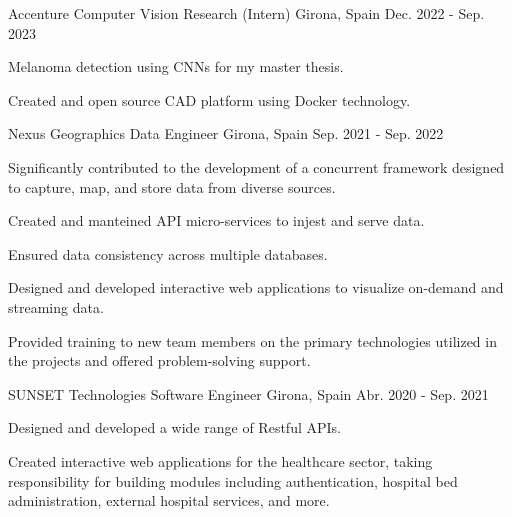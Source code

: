 \begin{cventries}
    \cventry
    {Accenture} %
    {Computer Vision Research (Intern)} %
    {Girona, Spain} %
    {Dec. 2022 - Sep. 2023} %
    {
    \begin{cvitems}
    \item{Melanoma detection using CNNs for my master thesis.}
    \item{Created and open source CAD platform using Docker technology.}
    \end{cvitems}
    }

      \cventry
      {Nexus Geographics} %
      {Data Engineer} %
      {Girona, Spain} %
      {Sep. 2021 - Sep. 2022} %
      {
        \begin{cvitems}
        \item {Significantly contributed to the development of a concurrent
          framework designed to capture, map, and store data from diverse
        sources.}
        \item {Created and manteined API micro-services to injest and serve data.}
        \item {Ensured data consistency across multiple databases.}
        \item {Designed and developed interactive web applications to visualize
          on-demand and streaming data.}
        \item {Provided training to new team members on the primary
          technologies utilized in the projects and offered problem-solving
        support.}
        \end{cvitems}
      }


      \cventry
      {SUNSET Technologies} %
      {Software Engineer} %
      {Girona, Spain} %
      {Abr. 2020 - Sep. 2021} %
      {
        \begin{cvitems}
        \item {Designed and developed a wide range of Restful APIs.}
        \item {Created interactive web applications for the healthcare sector,
          taking responsibility for building modules including authentication,
        hospital bed administration, external hospital services, and more.}
        \end{cvitems}
      }

  \end{cventries}
